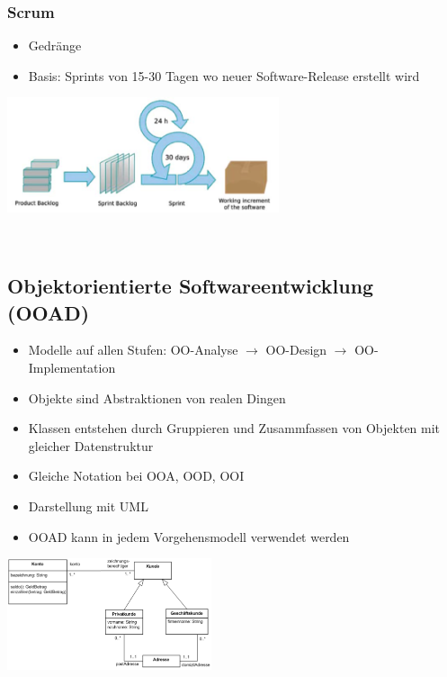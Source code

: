 \begin{multicols}{2}
\subsubsection{Scrum}
\begin{minipage}[l]{10cm}
	\begin{itemize}
		\item Gedränge
		\item Basis: Sprints von 15-30 Tagen wo neuer Software-Release erstellt wird
	\end{itemize}
\end{minipage}
\begin{minipage}{8cm}
	\includegraphics[width=8cm]{images/scrum.png}
\end{minipage}
\\
\end{multicols}

\subsection{Objektorientierte Softwareentwicklung (OOAD)}
\begin{minipage}{13cm}
	\begin{itemize}
		\item Modelle auf allen Stufen: OO-Analyse $\rightarrow$ OO-Design $\rightarrow$ OO-Implementation
		\item Objekte sind Abstraktionen von realen Dingen
		\item Klassen entstehen durch Gruppieren und Zusammfassen von Objekten mit gleicher Datenstruktur
		\item Gleiche Notation bei OOA, OOD, OOI
		\item Darstellung mit UML
		\item OOAD kann in jedem Vorgehensmodell verwendet werden
	\end{itemize}
\end{minipage}
\begin{minipage}{6cm}%
	\includegraphics[width=6cm]{images/uml.png}
\end{minipage}

